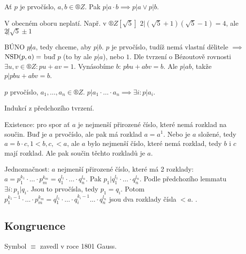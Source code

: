 \documentclass[12pt]{article}                   %
\begin{document}
        \begin{lemma}
            Ať $p$ je prvočíslo, $a, b \in ®Z$. Pak $p|a·b \implies p|a \lor p|b$.

            \begin{poznamkain}
                V obecném oboru neplatí. Např. v $®Z[\sqrt{5}]$ $2|(\sqrt{5} + 1)(\sqrt{5} - 1) = 4$, ale $2\not|\sqrt{5} ± 1$
            \end{poznamkain}

            \begin{dukazin}
                BÚNO $p \not| a$, tedy chceme, aby $p|b$. $p$ je prvočíslo, tudíž nemá vlastní dělitele $\implies$ $\operatorname{NSD}(p, a) = $ buď $p$ (to by ale $p|a$), nebo $1$. Dle tvrzení o Bézoutově rovnosti $\exists u, v \in ®Z: pu+av = 1$. Vynásobíme $b$: $pbu + abv = b$. Ale $p | ab$, takže $p | pbu + abv = b$.
            \end{dukazin}
        \end{lemma}

        \begin{lemma}
            $p$ prvočíslo, $a_1, …, a_n \in ®Z$. $p|a_1 · … · a_n \implies \exists i: p | a_i$.

            \begin{dukazin}
                Indukcí z předchozího tvrzení.
            \end{dukazin}
        \end{lemma}

        \begin{dukaz}
            Existence: pro spor ať $a$ je nejmenší přirozené číslo, které nemá rozklad na součin. Buď je $a$ prvočíslo, ale pak má rozklad $a = a^1$. Nebo je $a$ složené, tedy $a=b·c, 1 < b, c, < a$, ale $a$ bylo nejmenší číslo, které nemá rozklad, tedy $b$ i $c$ mají rozklad. Ale pak součin těchto rozkladů je $a$.

            Jednoznačnost: $a$ nejmenší přirozené číslo, které má 2 rozklady: $a = p_1^{k_1} · … · p_m^{k_m} = q_1^{l_1}·…·q_n^{l_n}$. Pak $p_1 | q_1^{l_1}·…·q_n^{l_n}$. Podle předchozího lemmatu $\exists i: p_1 | q_i$. Jsou to prvočísla, tedy $p_1 = q_i$. Potom $p_1^{k_1-1} · … · p_m^{k_m} = q_1^{l_1}·…·q_i^{k_i - 1}…·q_n^{l_n}$ jsou dva rozklady čísla $< a$. \lightning.
        \end{dukaz}

    \subsection{Kongruence}
        \begin{poznamka}[Historie]
            Symbol $≡$ zavedl v roce 1801 Gauss.
        \end{poznamka}
\end{document}
